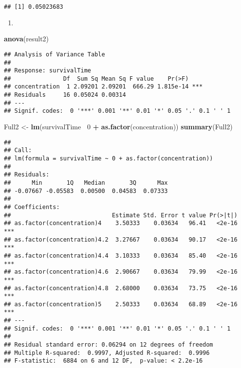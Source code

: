 \documentclass[
]{article}
\newenvironment{Shaded}{\begin{snugshade}}{\end{snugshade}}
\newcommand{\DecValTok}[1]{\textcolor[rgb]{0.00,0.00,0.81}{#1}}
\newcommand{\KeywordTok}[1]{\textcolor[rgb]{0.13,0.29,0.53}{\textbf{#1}}}
\newcommand{\NormalTok}[1]{#1}
\newcommand{\OperatorTok}[1]{\textcolor[rgb]{0.81,0.36,0.00}{\textbf{#1}}}
\newcommand{\StringTok}[1]{\textcolor[rgb]{0.31,0.60,0.02}{#1}}
\begin{document}
\begin{verbatim}
## [1] 0.05023683
\end{verbatim}

\begin{enumerate}
\def\labelenumi{(\roman{enumi})}
\item
\end{enumerate}

\begin{Shaded}
\begin{Highlighting}[]
\KeywordTok{anova}\NormalTok{(result2)}
\end{Highlighting}
\end{Shaded}

\begin{verbatim}
## Analysis of Variance Table
## 
## Response: survivalTime
##               Df  Sum Sq Mean Sq F value    Pr(>F)    
## concentration  1 2.09201 2.09201  666.29 1.815e-14 ***
## Residuals     16 0.05024 0.00314                      
## ---
## Signif. codes:  0 '***' 0.001 '**' 0.01 '*' 0.05 '.' 0.1 ' ' 1
\end{verbatim}

\begin{Shaded}
\begin{Highlighting}[]
\NormalTok{Full2 <-}\StringTok{ }\KeywordTok{lm}\NormalTok{(survivalTime}\OperatorTok{~}\StringTok{ }\DecValTok{0} \OperatorTok{+}\StringTok{ }\KeywordTok{as.factor}\NormalTok{(concentration))}
\KeywordTok{summary}\NormalTok{(Full2)}
\end{Highlighting}
\end{Shaded}

\begin{verbatim}
## 
## Call:
## lm(formula = survivalTime ~ 0 + as.factor(concentration))
## 
## Residuals:
##      Min       1Q   Median       3Q      Max 
## -0.07667 -0.05583  0.00500  0.04583  0.07333 
## 
## Coefficients:
##                             Estimate Std. Error t value Pr(>|t|)    
## as.factor(concentration)4    3.50333    0.03634   96.41   <2e-16 ***
## as.factor(concentration)4.2  3.27667    0.03634   90.17   <2e-16 ***
## as.factor(concentration)4.4  3.10333    0.03634   85.40   <2e-16 ***
## as.factor(concentration)4.6  2.90667    0.03634   79.99   <2e-16 ***
## as.factor(concentration)4.8  2.68000    0.03634   73.75   <2e-16 ***
## as.factor(concentration)5    2.50333    0.03634   68.89   <2e-16 ***
## ---
## Signif. codes:  0 '***' 0.001 '**' 0.01 '*' 0.05 '.' 0.1 ' ' 1
## 
## Residual standard error: 0.06294 on 12 degrees of freedom
## Multiple R-squared:  0.9997, Adjusted R-squared:  0.9996 
## F-statistic:  6884 on 6 and 12 DF,  p-value: < 2.2e-16
\end{verbatim}
\end{document}
